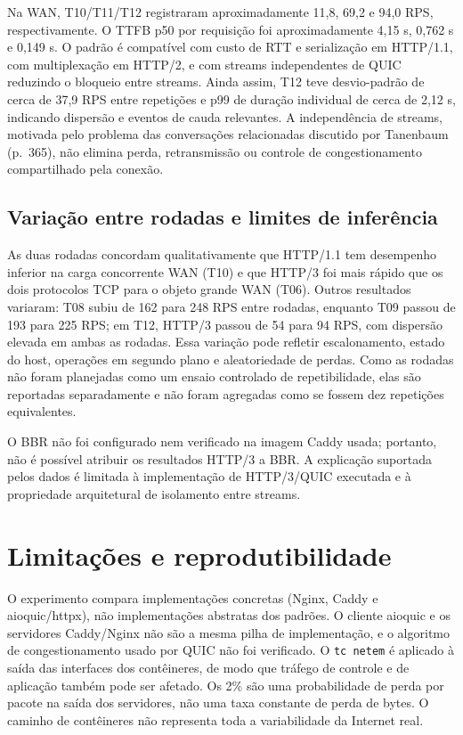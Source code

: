 \documentclass[12pt,a4paper]{article}
\begin{document}
Na WAN, T10/T11/T12 registraram aproximadamente 11,8, 69,2 e 94,0 RPS, respectivamente.
O TTFB p50 por requisição foi aproximadamente 4,15 s, 0,762 s e 0,149 s. O padrão é
compatível com custo de RTT e serialização em HTTP/1.1, com multiplexação em HTTP/2, e com
streams independentes de QUIC reduzindo o bloqueio entre streams. Ainda assim, T12 teve
desvio-padrão de cerca de 37,9 RPS entre repetições e p99 de duração individual de cerca de
2,12 s, indicando dispersão e eventos de cauda relevantes. A independência de streams, motivada pelo problema das conversações relacionadas
discutido por Tanenbaum (p.~365), não elimina perda, retransmissão ou controle de
congestionamento compartilhado pela conexão.

\subsection{Variação entre rodadas e limites de inferência}

As duas rodadas concordam qualitativamente que HTTP/1.1 tem desempenho inferior na carga
concorrente WAN (T10) e que HTTP/3 foi mais rápido que os dois protocolos TCP para o objeto
grande WAN (T06). Outros resultados variaram: T08 subiu de 162 para 248 RPS entre rodadas,
enquanto T09 passou de 193 para 225 RPS; em T12, HTTP/3 passou de 54 para 94 RPS, com
dispersão elevada em ambas as rodadas. Essa variação pode refletir escalonamento, estado do
host, operações em segundo plano e aleatoriedade de perdas. Como as rodadas não foram
planejadas como um ensaio controlado de repetibilidade, elas são reportadas separadamente e
não foram agregadas como se fossem dez repetições equivalentes.

O BBR não foi configurado nem verificado na imagem Caddy usada; portanto, não é possível
atribuir os resultados HTTP/3 a BBR. A explicação suportada pelos dados é limitada à
implementação de HTTP/3/QUIC executada e à propriedade arquitetural de isolamento entre
streams.

\section{Limitações e reprodutibilidade}

O experimento compara implementações concretas (Nginx, Caddy e aioquic/httpx), não
implementações abstratas dos padrões. O cliente aioquic e os servidores Caddy/Nginx não são
a mesma pilha de implementação, e o algoritmo de congestionamento usado por QUIC não foi
verificado. O \texttt{tc netem} é aplicado à saída das interfaces dos contêineres, de modo que
tráfego de controle e de aplicação também pode ser afetado. Os 2\% são uma probabilidade de
perda por pacote na saída dos servidores, não uma taxa constante de perda de bytes. O caminho
de contêineres não representa toda a variabilidade da Internet real.
\end{document}
